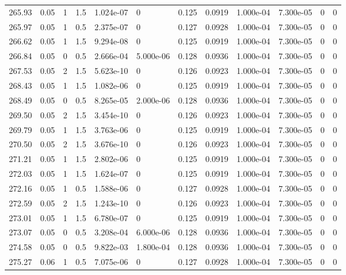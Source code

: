 \documentclass[preview]{standalone}
\begin{document}
{{{{{{{{{\begin{tabular}{L{1.2cm}C{1.2cm} C{0.3cm}C{0.5cm} C{1.4cm}C{1.4cm} C{1.4cm}C{1.4cm} C{1.6cm}C{1.6cm} C{1.6cm}C{1.6cm}}
  265.93  &  0.05  & 1     & 1.5 &  1.024e-07  & 0  &  0.125&   0.0919& 1.000e-04 & 7.300e-05   &  0 & 0  \\ 
  265.97  &  0.05  & 1     & 0.5 &  2.375e-07  & 0  &  0.127&   0.0928& 1.000e-04 & 7.300e-05   &  0 & 0  \\ 
  266.62  &  0.05  & 1     & 1.5 &  9.294e-08  & 0  &  0.125&   0.0919& 1.000e-04 & 7.300e-05   &  0 & 0  \\ 
  266.84  &  0.05  & 0     & 0.5 &  2.666e-04  & 5.000e-06  &  0.128&   0.0936& 1.000e-04 & 7.300e-05   &  0 & 0  \\ 
  267.53  &  0.05  & 2     & 1.5 &  5.623e-10  & 0  &  0.126&   0.0923& 1.000e-04 & 7.300e-05   &  0 & 0  \\ 
  268.43  &  0.05  & 1     & 1.5 &  1.082e-06  & 0  &  0.125&   0.0919& 1.000e-04 & 7.300e-05   &  0 & 0  \\ 
  268.49  &  0.05  & 0     & 0.5 &  8.265e-05  & 2.000e-06  &  0.128&   0.0936& 1.000e-04 & 7.300e-05   &  0 & 0  \\ 
  269.50  &  0.05  & 2     & 1.5 &  3.454e-10  & 0  &  0.126&   0.0923& 1.000e-04 & 7.300e-05   &  0 & 0  \\ 
  269.79  &  0.05  & 1     & 1.5 &  3.763e-06  & 0  &  0.125&   0.0919& 1.000e-04 & 7.300e-05   &  0 & 0  \\ 
  270.50  &  0.05  & 2     & 1.5 &  3.676e-10  & 0  &  0.126&   0.0923& 1.000e-04 & 7.300e-05   &  0 & 0  \\ 
  271.21  &  0.05  & 1     & 1.5 &  2.802e-06  & 0  &  0.125&   0.0919& 1.000e-04 & 7.300e-05   &  0 & 0  \\ 
  272.03  &  0.05  & 1     & 1.5 &  1.624e-07  & 0  &  0.125&   0.0919& 1.000e-04 & 7.300e-05   &  0 & 0  \\ 
  272.16  &  0.05  & 1     & 0.5 &  1.588e-06  & 0  &  0.127&   0.0928& 1.000e-04 & 7.300e-05   &  0 & 0  \\ 
  272.59  &  0.05  & 2     & 1.5 &  1.243e-10  & 0  &  0.126&   0.0923& 1.000e-04 & 7.300e-05   &  0 & 0  \\ 
  273.01  &  0.05  & 1     & 1.5 &  6.780e-07  & 0  &  0.125&   0.0919& 1.000e-04 & 7.300e-05   &  0 & 0  \\ 
  273.07  &  0.05  & 0     & 0.5 &  3.208e-04  & 6.000e-06  &  0.128&   0.0936& 1.000e-04 & 7.300e-05   &  0 & 0  \\ 
  274.58  &  0.05  & 0     & 0.5 &  9.822e-03  & 1.800e-04  &  0.128&   0.0936& 1.000e-04 & 7.300e-05   &  0 & 0  \\ 
  275.27  &  0.06  & 1     & 0.5 &  7.075e-06  & 0  &  0.127&   0.0928& 1.000e-04 & 7.300e-05   &  0 & 0  \\ 

\end{tabular}}}}}}}}}}
\end{document}
